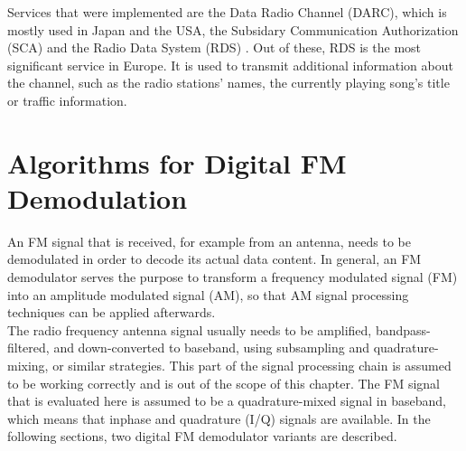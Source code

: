 Services that were implemented are the Data Radio Channel (DARC), which is mostly used in Japan and the USA, the Subsidary Communication Authorization (SCA) and the Radio Data System (RDS) \cite{RohdeSchwarzFM}.
Out of these, RDS is the most significant service in Europe.
It is used to transmit additional information about the channel, such as the radio stations' names, the currently playing song's title or traffic information.



\section{Algorithms for Digital FM Demodulation}
\label{sec:algorithms-for-digital-fm-demodulation}

An FM signal that is received, for example from an antenna, needs to be demodulated in order to decode its actual data content.
In general, an FM demodulator serves the purpose to transform a frequency modulated signal (FM) into an amplitude modulated signal (AM), so that AM signal processing techniques can be applied afterwards.\\

The radio frequency antenna signal usually needs to be amplified, bandpass-filtered, and down-converted to baseband, using subsampling and quadrature-mixing, or similar strategies.
This part of the signal processing chain is assumed to be working correctly and is out of the scope of this chapter. %
The FM signal that is evaluated here is assumed to be a quadrature-mixed signal in baseband, which means that inphase and quadrature (I/Q) signals are available.
%
%
In the following sections, two digital FM demodulator variants are described.



